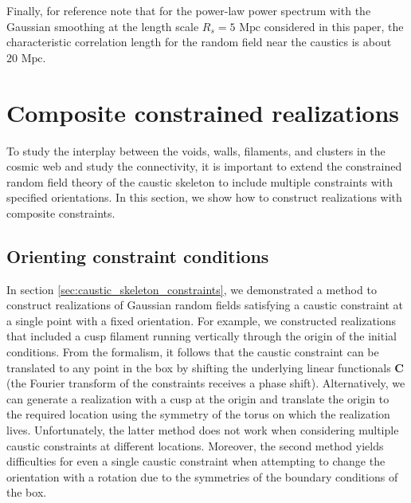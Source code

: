 \documentclass[a4paper, 11pt]{article}
\begin{document}
Finally, for reference note that for the power-law power spectrum with the Gaussian smoothing at the length scale $R_s=5\text{ Mpc}$ considered in this paper, the characteristic correlation length for the random field near the caustics is about $20\text{ Mpc}$.

\section{Composite constrained realizations}\label{sec:composite_constraints}
To study the interplay between the voids, walls, filaments, and clusters in the cosmic web and study the connectivity, it is important to extend the constrained random field theory of the caustic skeleton to include multiple constraints with specified orientations. In this section, we show how to construct realizations with composite constraints.

\subsection{Orienting constraint conditions}\label{sec:orientation}
In section \ref{sec:caustic_skeleton_constraints}, we demonstrated a method to construct realizations of Gaussian random fields satisfying a caustic constraint at a single point with a fixed orientation. For example, we constructed realizations that included a cusp filament running vertically through the origin of the initial conditions. From the formalism, it follows that the caustic constraint can be translated to any point in the box by shifting the underlying linear functionals $\bm{C}$ (the Fourier transform of the constraints receives a phase shift). Alternatively, we can generate a realization with a cusp at the origin and translate the origin to the required location using the symmetry of the torus on which the realization lives. Unfortunately, the latter method does not work when considering multiple caustic constraints at different locations. Moreover, the second method yields difficulties for even a single caustic constraint when attempting to change the orientation with a rotation due to the symmetries of the boundary conditions of the box.
\end{document}
